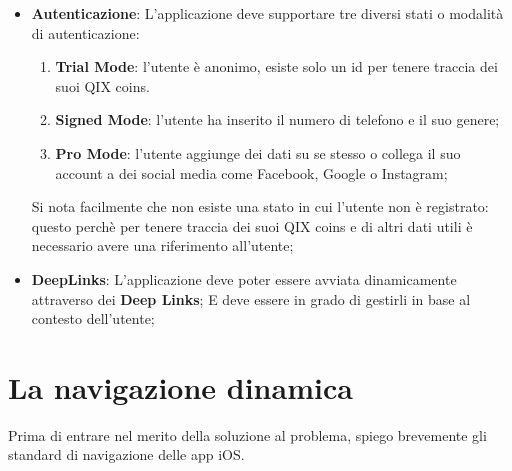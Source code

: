 \begin{itemize}
{        Tale gravità finirà con la fine dell'animazione o l'apparizione di una nuova pagina se presente;
    }
    \item {
        \textbf{Autenticazione}: L'applicazione deve supportare tre diversi stati o modalità di autenticazione:
        \begin{enumerate}
            \item\textbf{Trial Mode}: l'utente è anonimo, esiste solo un id per tenere traccia dei suoi QIX coins.
            \item\textbf{Signed Mode}: l'utente ha inserito il numero di telefono e il suo genere;
            \item \textbf{Pro Mode}: l'utente aggiunge dei dati su se stesso o collega il suo account a dei social media come Facebook, Google o Instagram;
        \end{enumerate}
        Si nota facilmente che non esiste una stato in cui l'utente non è registrato: questo perchè
        per tenere traccia dei suoi QIX coins e di altri dati utili è necessario avere una riferimento all'utente;
    }
    \item {
        \textbf{DeepLinks}: L'applicazione deve poter essere avviata dinamicamente
        attraverso dei \textbf{Deep Links}\cite{deeplinks};
        E deve essere in grado di gestirli in base al contesto dell'utente;
    }
\end{itemize}

\section{La navigazione dinamica}


Prima di entrare nel merito della soluzione al problema, spiego brevemente gli
standard di navigazione delle app iOS.

